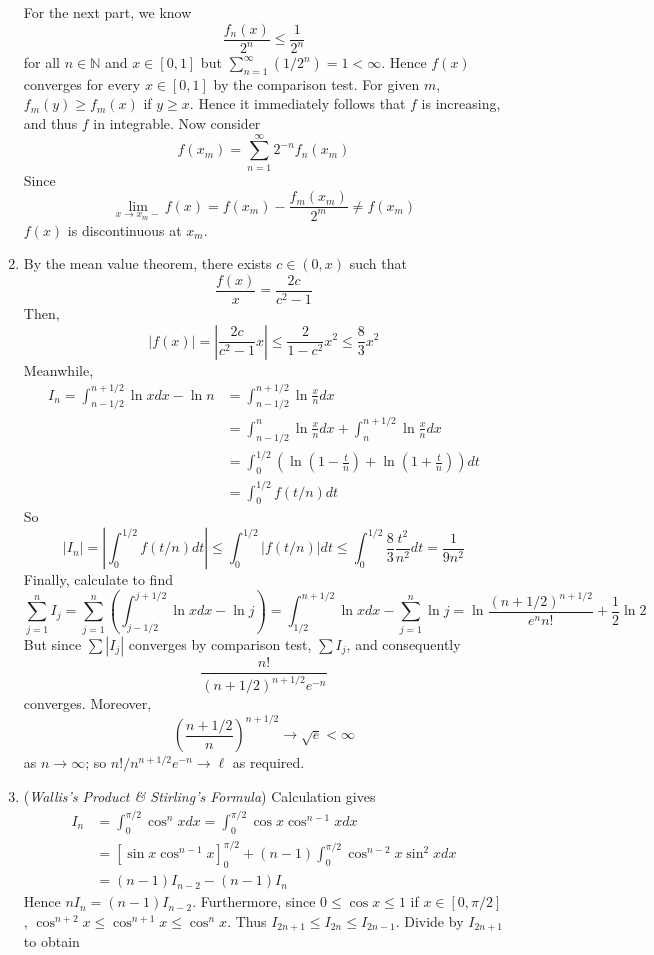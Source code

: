 \documentclass[10pt, a4paper, twoside]{report}
\begin{document}
\begin{enumerate}[{1.}]
    For the next part, we know 
    \[\frac{f_n(x)}{2^n}\leq\frac 1{2^n}\]
    for all \(n\in\mathbb{N}\) and \(x\in[0,1]\) but \(\sum_{n=1}^{\infty}(1/2^n)=1<\infty\). Hence \(f(x)\) converges for every \(x\in[0,1]\) by the comparison test. For given \(m\), \(f_m(y)\geq f_m(x)\) if \(y\geq x\). Hence it immediately follows that \(f\) is increasing, and thus \(f\) in integrable. Now consider 
    \[f(x_m)=\sum_{n=1}^{\infty}2^{-n}f_n(x_m)\]
    Since 
    \[\lim_{x\to x_m-}f(x)=f(x_m)-\frac{f_m(x_m)}{2^m}\neq f(x_m)\]
    \(f(x)\) is discontinuous at \(x_m\). 
    \item By the mean value theorem, there exists \(c\in(0,x)\) such that 
    \[\frac{f(x)}{x}=\frac{2c}{c^2-1}\]
    Then,
    \[|f(x)|=\left|\frac{2c}{c^2-1}x\right|\leq\frac{2}{1-c^2}x^2\leq\frac 83x^2\]
    Meanwhile,
    \begin{align*}
        I_n=\int_{n-1/2}^{n+1/2}\ln xdx-\ln n&=\int_{n-1/2}^{n+1/2}\ln\frac xndx \\
        &=\int_{n-1/2}^n\ln\frac xndx+\int_n^{n+1/2}\ln\frac xndx \\
        &=\int_0^{1/2}\left(\ln\left(1-\frac tn\right)+\ln\left(1+\frac tn\right)\right)dt\\
        &=\int_0^{1/2}f(t/n)dt
    \end{align*}
    So
    \[|I_n|=\left|\int_0^{1/2}f(t/n)dt\right|\leq\int_0^{1/2}|f(t/n)|dt\leq\int_0^{1/2}\frac 83\frac{t^2}{n^2}dt=\frac{1}{9n^2}\]
    Finally, calculate to find
    \[\sum_{j=1}^{n}I_j=\sum_{j=1}^{n}\left(\int_{j-1/2}^{j+1/2}\ln xdx-\ln j\right)=\int_{1/2}^{n+1/2}\ln xdx-\sum_{j=1}^{n}\ln j=\ln\frac{(n+1/2)^{n+1/2}}{e^nn!}+\frac 12\ln 2\]
    But since \(\sum|I_j|\) converges by comparison test, \(\sum I_j\), and consequently 
    \[\frac{n!}{(n+1/2)^{n+1/2}e^{-n}}\]
    converges. Moreover,
    \[\left(\frac{n+1/2}{n}\right)^{n+1/2}\to\sqrt{e}<\infty\]
    as \(n\to\infty\); so \(n!/n^{n+1/2}e^{-n}\to\ell\) as required.
    \item (\emph{Wallis's Product \& Stirling's Formula}) Calculation gives 
    \begin{align*}
        I_n&=\int_0^{\pi/2}\cos^nxdx=\int_0^{\pi/2}\cos x\cos^{n-1}xdx \\
        &=\left[\sin x\cos^{n-1}x\right]_0^{\pi/2}+(n-1)\int_0^{\pi/2}\cos^{n-2}x\sin^2xdx \\
        &=(n-1)I_{n-2}-(n-1)I_n
    \end{align*}
    Hence \(nI_n=(n-1)I_{n-2}\). Furthermore, since \(0\leq\cos x\leq 1\) if \(x\in[0,\pi/2]\), \(\cos^{n+2}x\leq\cos^{n+1}x\leq\cos^n x\). Thus \(I_{2n+1}\leq I_{2n}\leq I_{2n-1}\). Divide by \(I_{2n+1}\) to obtain 

\end{enumerate}
\end{document}
